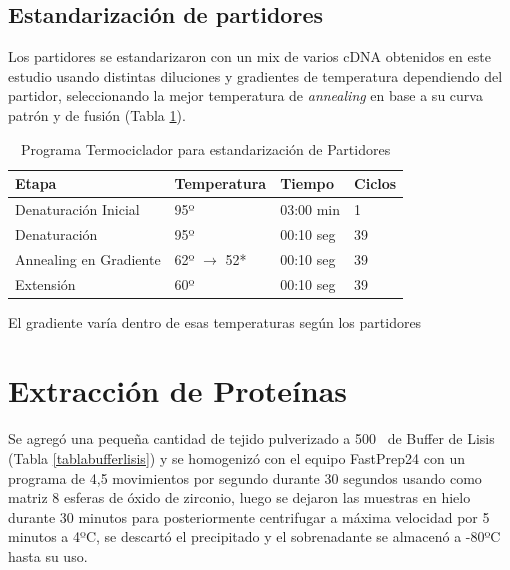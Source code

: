 \documentclass[12pt,letterpaper,oneside]{scrbook}
\begin{document}
\subsection{Estandarización de partidores}

Los partidores se estandarizaron con un mix de varios cDNA obtenidos en
este estudio usando distintas diluciones y gradientes de temperatura
dependiendo del partidor, seleccionando la mejor temperatura de
\emph{annealing} en base a su curva patrón y de fusión (Tabla
\ref{tabla:estandar}).

\begin{table}[h!]
    \begin{center}
        \begin{threeparttable}
            \caption{Programa Termociclador para estandarización de Partidores}\label{tabla:estandar}
            \begin{tabularx}{13cm}{l X l l}
                \toprule
                Etapa & Temperatura & Tiempo & Ciclos \\
                \midrule
                Denaturación Inicial & 95º & 03:00 min & 1 \\
                Denaturación & 95º & 00:10 seg & 39\\
                Annealing en Gradiente & 62º $\rightarrow$ 52* & 00:10 seg & 39 \\
                Extensión & 60º & 00:10 seg & 39 \\
                \bottomrule
            \end{tabularx}
            \begin{tablenotes}
                \item El gradiente varía dentro de esas temperaturas según los partidores
            \end{tablenotes}
        \end{threeparttable}
    \end{center}
\end{table}

\section{Extracción de Proteínas}

Se agregó una pequeña cantidad de tejido pulverizado a
500\si{\micro\litro} de Buffer de Lisis (Tabla \ref{tablabufferlisis}) y
se homogenizó con el equipo FastPrep24 con un programa de 4,5
movimientos por segundo durante 30 segundos usando como matriz 8 esferas
de óxido de zirconio, luego se dejaron las muestras en hielo durante 30
minutos para posteriormente centrifugar a máxima velocidad por 5 minutos
a 4ºC, se descartó el precipitado y el sobrenadante se almacenó a -80ºC
hasta su uso.
\end{document}
